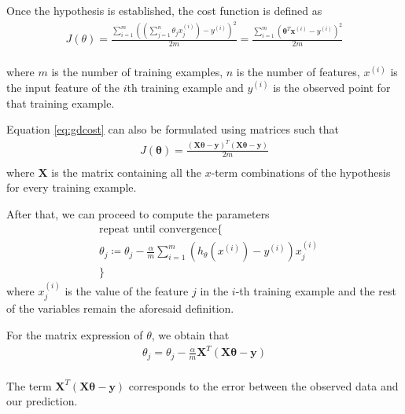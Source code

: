 \documentclass[a4paper, report, oneside, UKenglish]{memoir}
\newcommand{\x}{\boldsymbol{x}}
\newcommand{\by}{\boldsymbol{y}}
\newcommand{\btheta}{\boldsymbol{\theta}}
\begin{document}
Once the hypothesis is established, the cost function is defined as
\begin{equation}\label{eq:gdcost}
\begin{split}
    J(\theta) = \frac{\sum\limits_{i=1}^{m} ((\sum\limits_{j=1}^{n}\theta_{j}x_{j}^{(i)}) - y^{(i)})^{2}}{2m} = \frac{\sum\limits_{i=1}^{m}(\btheta^{T}\x^{(i)} - y^{(i)})^{2}}{2m}\\
\end{split}
\end{equation}

where $m$ is the number of training examples, $n$ is the number of features, $x^{(i)}$ is the input feature of the $i$th training example and $y^{(i)}$ is the observed point for that training example. 

Equation \eqref{eq:gdcost} can also be formulated using matrices such that
\begin{equation}\label{eq:gdcostmatrix}
\begin{split}
    J(\btheta) = \frac{(\textbf{X}\btheta - \by)^{T}(\textbf{X}\btheta - \by)}{2m}\\
\end{split}
\end{equation}
where $\textbf{X}$ is the matrix containing all the $x$-term combinations of the hypothesis for every training example.

After that, we can proceed to compute the parameters
\begin{equation}\label{eq:gdtheta}
\begin{split}
    &\mbox{repeat until convergence}\{\\
    &\theta_{j} \coloneqq \theta_{j} - \frac{\alpha}{m} \sum\limits_{i=1}^{m}(h_{\theta}(x^{(i)}) -  y^{(i)})x_{j}^{(i)}\\
&\}
\end{split}
\end{equation}
where $x_{j}^{(i)}$ is the value of the feature $j$ in the $i$-th training example and the rest of the variables remain the aforesaid definition. 

For the matrix expression of $\theta$, we obtain that
\begin{equation}\label{eq:gdthetaMatrix}
\begin{split}
    \theta_{j} = \theta_{j} - \frac{\alpha}{m}\textbf{X}^T(\textbf{X}\btheta - \by)\\
\end{split}
\end{equation}

The term $\textbf{X}^T(\textbf{X}\btheta - \by)$ corresponds to the error between the observed data and our prediction.
\end{document}
